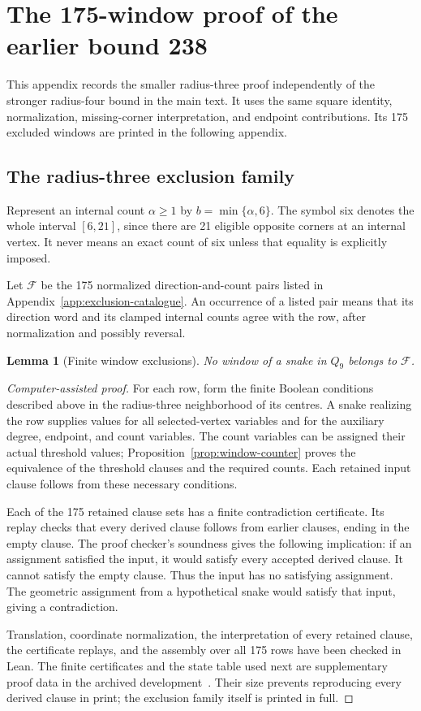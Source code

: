 \documentclass[11pt,a4paper]{article}
\newtheorem{lemma}[theorem]{Lemma}
\theoremstyle{definition}
\theoremstyle{remark}
\newcommand{\Q}{Q}
\begin{document}
\section{The 175-window proof of the earlier bound 238}\label{app:bound238}
This appendix records the smaller radius-three proof independently of the stronger radius-four bound in the main text. It uses the same square identity, normalization, missing-corner interpretation, and endpoint contributions. Its 175 excluded windows are printed in the following appendix.

\subsection{The radius-three exclusion family}
Represent an internal count $\alpha\ge1$ by $b=\min\{\alpha,6\}$. The symbol six denotes the whole interval $[6,21]$, since there are 21 eligible opposite corners at an internal vertex. It never means an exact count of six unless that equality is explicitly imposed.

Let $\mathcal F$ be the 175 normalized direction-and-count pairs listed in Appendix~\ref{app:exclusion-catalogue}. An occurrence of a listed pair means that its direction word and its clamped internal counts agree with the row, after normalization and possibly reversal.

\begin{lemma}[Finite window exclusions]\label{lem:finite-exclusions}
No window of a snake in $\Q_9$ belongs to $\mathcal F$.
\end{lemma}
\begin{proof}[Computer-assisted proof]
For each row, form the finite Boolean conditions described above in the radius-three neighborhood of its centres. A snake realizing the row supplies values for all selected-vertex variables and for the auxiliary degree, endpoint, and count variables. The count variables can be assigned their actual threshold values; Proposition~\ref{prop:window-counter} proves the equivalence of the threshold clauses and the required counts. Each retained input clause follows from these necessary conditions.

Each of the 175 retained clause sets has a finite contradiction certificate. Its replay checks that every derived clause follows from earlier clauses, ending in the empty clause. The proof checker's soundness gives the following implication: if an assignment satisfied the input, it would satisfy every accepted derived clause. It cannot satisfy the empty clause. Thus the input has no satisfying assignment. The geometric assignment from a hypothetical snake would satisfy that input, giving a contradiction.

Translation, coordinate normalization, the interpretation of every retained clause, the certificate replays, and the assembly over all 175 rows have been checked in Lean. The finite certificates and the state table used next are supplementary proof data in the archived development~\cite{proofarchive}. Their size prevents reproducing every derived clause in print; the exclusion family itself is printed in full.
\end{proof}
\end{document}
